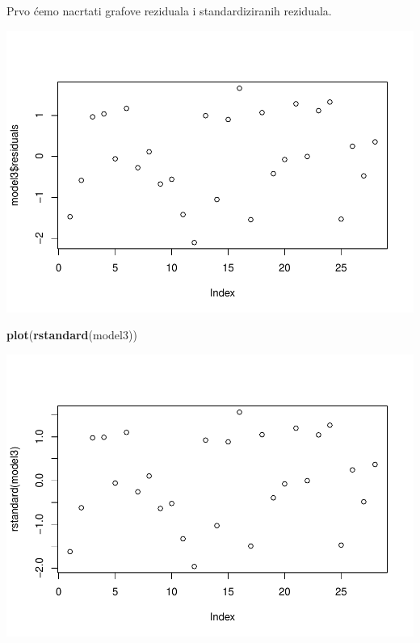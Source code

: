 \documentclass[]{article}
\newenvironment{Shaded}{\begin{snugshade}}{\end{snugshade}}
\newcommand{\KeywordTok}[1]{\textcolor[rgb]{0.13,0.29,0.53}{\textbf{{#1}}}}
\newcommand{\NormalTok}[1]{{#1}}
\begin{document}
Prvo ćemo nacrtati grafove reziduala i standardiziranih reziduala.

\begin{Shaded}
\end{Shaded}

\includegraphics{Izvjestaj_files/figure-latex/unnamed-chunk-37-1.pdf}

\begin{Shaded}
\begin{Highlighting}[]
\KeywordTok{plot}\NormalTok{(}\KeywordTok{rstandard}\NormalTok{(model3))}
\end{Highlighting}
\end{Shaded}

\includegraphics{Izvjestaj_files/figure-latex/unnamed-chunk-37-2.pdf}
\end{document}
